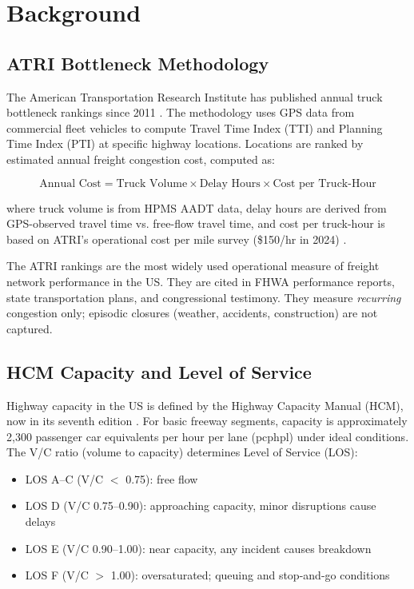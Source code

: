 \section{Background}

\subsection{ATRI Bottleneck Methodology}

The American Transportation Research Institute has published annual truck bottleneck rankings since 2011 \citep{ATRI2011}. The methodology uses GPS data from commercial fleet vehicles to compute Travel Time Index (TTI) and Planning Time Index (PTI) at specific highway locations. Locations are ranked by estimated annual freight congestion cost, computed as:

\begin{equation}
\text{Annual Cost} = \text{Truck Volume} \times \text{Delay Hours} \times \text{Cost per Truck-Hour}
\end{equation}

where truck volume is from HPMS AADT data, delay hours are derived from GPS-observed travel time vs. free-flow travel time, and cost per truck-hour is based on ATRI's operational cost per mile survey (\$150/hr in 2024) \citep{ATRI_costs2024}.

The ATRI rankings are the most widely used operational measure of freight network performance in the US. They are cited in FHWA performance reports, state transportation plans, and congressional testimony. They measure \textit{recurring} congestion only; episodic closures (weather, accidents, construction) are not captured.

\subsection{HCM Capacity and Level of Service}

Highway capacity in the US is defined by the Highway Capacity Manual (HCM), now in its seventh edition \citep{HCM7}. For basic freeway segments, capacity is approximately 2,300 passenger car equivalents per hour per lane (pcphpl) under ideal conditions. The V/C ratio (volume to capacity) determines Level of Service (LOS):

\begin{itemize}
\item LOS A--C (V/C $<$ 0.75): free flow
\item LOS D (V/C 0.75--0.90): approaching capacity, minor disruptions cause delays
\item LOS E (V/C 0.90--1.00): near capacity, any incident causes breakdown
\item LOS F (V/C $>$ 1.00): oversaturated; queuing and stop-and-go conditions
\end{itemize}

